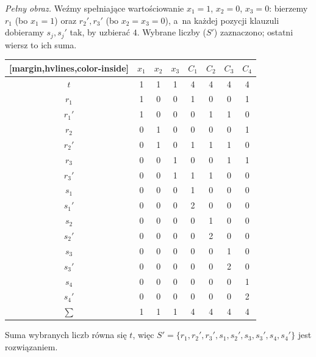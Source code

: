 \begin{example}
	\emph{Pełny obraz.} Weźmy spełniające wartościowanie $x_1 = 1$, $x_2 = 0$, $x_3 = 0$: bierzemy $r_1$ (bo $x_1 = 1$) oraz $r_2', r_3'$ (bo $x_2 = x_3 = 0$), a~na każdej pozycji klauzuli dobieramy $s_j, s_j'$ tak, by uzbierać $4$. Wybrane liczby ($S'$) zaznaczono; ostatni wiersz to ich suma.
	\begin{aztable}
		\centering
		\renewcommand{\arraystretch}{1.2}
		\begin{NiceTabular}{c|ccc|cccc}[margin,hvlines,color-inside]
			                          & $x_1$ & $x_2$ & $x_3$ & $C_1$ & $C_2$ & $C_3$ & $C_4$ \\
			\hline
			$t$                       & 1     & 1     & 1     & 4     & 4     & 4     & 4     \\
			\hline
			 $r_1$  & 1     & 0     & 0     & 1     & 0     & 0     & 1     \\
			$r_1'$                    & 1     & 0     & 0     & 0     & 1     & 1     & 0     \\
			$r_2$                     & 0     & 1     & 0     & 0     & 0     & 0     & 1     \\
			 $r_2'$ & 0     & 1     & 0     & 1     & 1     & 1     & 0     \\
			$r_3$                     & 0     & 0     & 1     & 0     & 0     & 1     & 1     \\
			 $r_3'$ & 0     & 0     & 1     & 1     & 1     & 0     & 0     \\
			 $s_1$  & 0     & 0     & 0     & 1     & 0     & 0     & 0     \\
			$s_1'$                    & 0     & 0     & 0     & 2     & 0     & 0     & 0     \\
			$s_2$                     & 0     & 0     & 0     & 0     & 1     & 0     & 0     \\
			 $s_2'$ & 0     & 0     & 0     & 0     & 2     & 0     & 0     \\
			 $s_3$  & 0     & 0     & 0     & 0     & 0     & 1     & 0     \\
			 $s_3'$ & 0     & 0     & 0     & 0     & 0     & 2     & 0     \\
			 $s_4$  & 0     & 0     & 0     & 0     & 0     & 0     & 1     \\
			 $s_4'$ & 0     & 0     & 0     & 0     & 0     & 0     & 2     \\
			\hline
			$\sum$                    & 1     & 1     & 1     & 4     & 4     & 4     & 4     \\
		\end{NiceTabular}
	\end{aztable}
	Suma wybranych liczb równa się $t$, więc $S' = \{r_1, r_2', r_3', s_1, s_2', s_3, s_3', s_4, s_4'\}$ jest rozwiązaniem.
\end{example}
